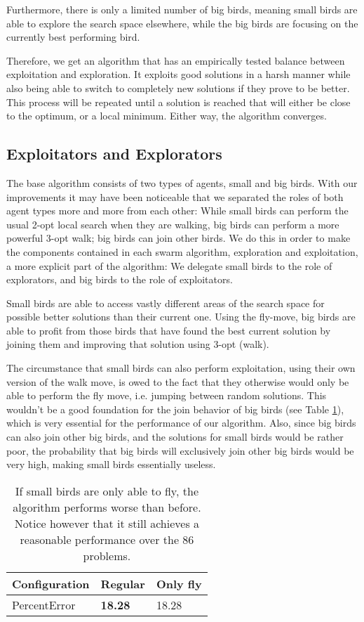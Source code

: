Furthermore, there is only a limited number of big birds, meaning small birds are able
to explore the search space elsewhere, while the big birds are focusing on the currently best performing bird.

Therefore, we get an algorithm that has an empirically tested balance between exploitation and exploration.
It exploits good solutions in a harsh manner while also being able to switch to completely new solutions if they prove to be better.
This process will be repeated until a solution is reached that will either be close to the optimum, or a local minimum.
Either way, the algorithm converges.

\subsection{Exploitators and Explorators}
The base algorithm consists of two types of agents, small and big birds.
With our improvements it may have been noticeable that we separated the roles
of both agent types more and more from each other:
While small birds can perform the usual 2-opt local search when they are walking,
big birds can perform a more powerful 3-opt walk;
big birds can join other birds.
We do this in order to make the components contained in each swarm algorithm,
exploration and exploitation, a more explicit part of the algorithm:
We delegate small birds to the role of explorators, and big birds to the role of exploitators.

Small birds are able to access vastly different areas of the search space for possible better
solutions than their current one. Using the fly-move, big birds are able to profit
from those birds that have found the best current solution by joining them and
improving that solution using 3-opt (walk).


The circumstance that small birds can also perform exploitation, using their own version of the walk move,
is owed to the fact that they otherwise would only be able to perform
the fly move, i.e. jumping between random solutions.
This wouldn’t be a good foundation for the join behavior of big birds (see Table \ref{small_birds_only_fly}),
which is very essential for the performance of our algorithm.
Also, since big birds can also join other big birds,
and the solutions for small birds would be rather poor, the probability that
big birds will exclusively join other big birds would be very high,
making small birds essentially useless.

\begin{table}[h!]
\centering
\begin{tabular}{ |p{2.5cm}||p{0.75cm}|p{0.75cm}|  }
 \hline
 Configuration& Regular & Only fly\\
 \hline \hline
PercentError & \textbf{18.28} & 18.28\\
\hline
\end{tabular}
\caption{If small birds are only able to fly, the algorithm performs worse than before. Notice however that it still achieves a reasonable performance over the 86 problems.}
\label{small_birds_only_fly}
\end{table}
